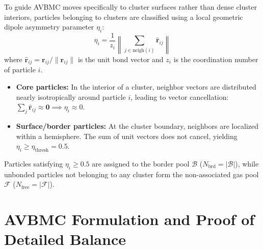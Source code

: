 \documentclass[11pt,a4paper]{article}
\begin{document}
To guide AVBMC moves specifically to cluster surfaces rather than dense cluster interiors, particles belonging to clusters are classified using a local geometric dipole asymmetry parameter $\eta_i$:
\begin{equation}
\eta_i = \frac{1}{z_i} \left\| \sum_{j \in \text{neigh}(i)} \hat{\mathbf{r}}_{ij} \right\|
\end{equation}
where $\hat{\mathbf{r}}_{ij} = \mathbf{r}_{ij} / \|\mathbf{r}_{ij}\|$ is the unit bond vector and $z_i$ is the coordination number of particle $i$. 
\begin{itemize}
    \item \textbf{Core particles:} In the interior of a cluster, neighbor vectors are distributed nearly isotropically around particle $i$, leading to vector cancellation: $\sum_j \hat{\mathbf{r}}_{ij} \approx \mathbf{0} \implies \eta_i \approx 0$.
    \item \textbf{Surface/border particles:} At the cluster boundary, neighbors are localized within a hemisphere. The sum of unit vectors does not cancel, yielding $\eta_i \ge \eta_{\text{thresh}} = 0.5$.
\end{itemize}
Particles satisfying $\eta_i \ge 0.5$ are assigned to the border pool $\mathcal{B}$ ($N_{\text{brd}} = |\mathcal{B}|$), while unbonded particles not belonging to any cluster form the non-associated gas pool $\mathcal{F}$ ($N_{\text{free}} = |\mathcal{F}|$).

\section{AVBMC Formulation and Proof of Detailed Balance}
\end{document}
